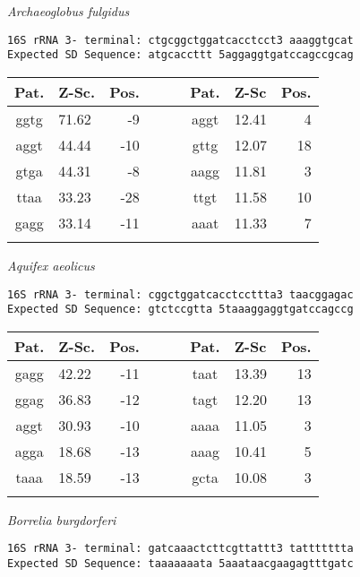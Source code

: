 \vspace{1em}
\noindent
{\it Archaeoglobus fulgidus    }
\begin{verbatim}
16S rRNA 3- terminal: ctgcggctggatcacctcct3 aaaggtgcat
Expected SD Sequence: atgcaccttt 5aggaggtgatccagccgcag
\end{verbatim}

\noindent
\begin{center}
\begin{tabular}{clrcclr}
Pat. & Z-Sc. & Pos. & \verb+   + & Pat. & Z-Sc & Pos. \\
\hline
ggtg & 71.62 & -9 &  & aggt & 12.41 & 4 \\
aggt & 44.44 & -10 &  & gttg & 12.07 & 18 \\
gtga & 44.31 & -8 &  & aagg & 11.81 & 3 \\
ttaa & 33.23 & -28 &  & ttgt & 11.58 & 10 \\
gagg & 33.14 & -11 &  & aaat & 11.33 & 7 \\
    &     \\
\end{tabular}
\end{center}

\vspace{1em}
\noindent
{\it Aquifex aeolicus    }
\begin{verbatim}
16S rRNA 3- terminal: cggctggatcacctccttta3 taacggagac
Expected SD Sequence: gtctccgtta 5taaaggaggtgatccagccg
\end{verbatim}

\noindent
\begin{center}
\begin{tabular}{clrcclr}
Pat. & Z-Sc. & Pos. & \verb+   + & Pat. & Z-Sc & Pos. \\
\hline
gagg & 42.22 & -11 &  & taat & 13.39 & 13 \\
ggag & 36.83 & -12 &  & tagt & 12.20 & 13 \\
aggt & 30.93 & -10 &  & aaaa & 11.05 & 3 \\
agga & 18.68 & -13 &  & aaag & 10.41 & 5 \\
taaa & 18.59 & -13 &  & gcta & 10.08 & 3 \\
    &     \\
\end{tabular}
\end{center}

\vspace{1em}
\noindent
{\it Borrelia burgdorferi    }
\begin{verbatim}
16S rRNA 3- terminal: gatcaaactcttcgttattt3 tattttttta
Expected SD Sequence: taaaaaaata 5aaataacgaagagtttgatc
\end{verbatim}

